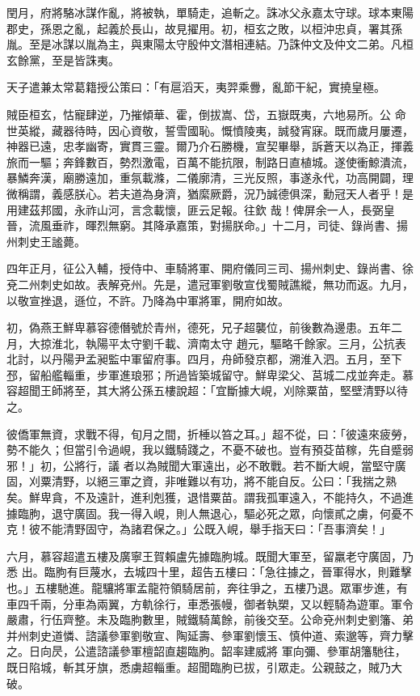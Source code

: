 \begin{pinyinscope}
 閏月，府將駱冰謀作亂，將被執，單騎走，追斬之。誅冰父永嘉太守球。球本東陽郡史，孫恩之亂，起義於長山，故見擢用。初，桓玄之敗，以桓沖忠貞，署其孫胤。至是冰謀以胤為主，與東陽太守殷仲文潛相連結。乃誅仲文及仲文二弟。凡桓玄餘黨，至是皆誅夷。



 天子遣兼太常葛籍授公策曰：「有扈滔天，夷羿乘釁，亂節干紀，實撓皇極。



 賊臣桓玄，怙寵肆逆，乃摧傾華、霍，倒拔嵩、岱，五嶽既夷，六地易所。公
 命世英縱，藏器待時，因心資敬，誓雪國恥。慨憤陵夷，誠發宵寐。既而歲月屢遷，神器已遠，忠孝幽寄，實貫三靈。爾乃介石勝機，宣契畢舉，訴蒼天以為正，揮義旅而一驅；奔鋒數百，勢烈激電，百萬不能抗限，制路日直植城。遂使衝鯨潰流，暴鱗奔漢，廟勝遠加，重氛載滌，二儀廓清，三光反照，事遂永代，功高開闢，理微稱謂，義感朕心。若夫道為身濟，猶縻厥爵，況乃誠德俱深，勳冠天人者乎！是用建茲邦國，永祚山河，言念載懷，匪云足報。往欽
 哉！俾屏余一人，長弼皇晉，流風垂祚，暉烈無窮。其降承嘉策，對揚朕命。」十二月，司徒、錄尚書、揚州刺史王謐薨。



 四年正月，征公入輔，授侍中、車騎將軍、開府儀同三司、揚州刺史、錄尚書、徐兗二州刺史如故。表解兗州。先是，遣冠軍劉敬宣伐蜀賊譙縱，無功而返。九月，以敬宣挫退，遜位，不許。乃降為中軍將軍，開府如故。



 初，偽燕王鮮卑慕容德僭號於青州，德死，兄子超襲位，前後數為邊患。五年二月，大掠淮北，執陽平太守劉千載、濟南太守
 趙元，驅略千餘家。三月，公抗表北討，以丹陽尹孟昶監中軍留府事。四月，舟師發京都，溯淮入泗。五月，至下邳，留船艦輜重，步軍進琅邪；所過皆築城留守。鮮卑梁父、莒城二戍並奔走。慕容超聞王師將至，其大將公孫五樓說超：「宜斷據大峴，刈除粟苗，堅壁清野以待之。



 彼僑軍無資，求戰不得，旬月之間，折棰以笞之耳。」超不從，曰：「彼遠來疲勞，勢不能久；但當引令過峴，我以鐵騎踐之，不憂不破也。豈有預芟苗稼，先自蹙弱邪！」初，公將行，議
 者以為賊聞大軍遠出，必不敢戰。若不斷大峴，當堅守廣固，刈粟清野，以絕三軍之資，非唯難以有功，將不能自反。公曰：「我揣之熟矣。鮮卑貪，不及遠計，進利剋獲，退惜粟苗。謂我孤軍遠入，不能持久，不過進據臨朐，退守廣固。我一得入峴，則人無退心，驅必死之眾，向懷貳之虜，何憂不克！彼不能清野固守，為諸君保之。」公既入峴，舉手指天曰：「吾事濟矣！」



 六月，慕容超遣五樓及廣寧王賀賴盧先據臨朐城。既聞大軍至，留羸老守廣固，乃悉
 出。臨朐有巨蔑水，去城四十里，超告五樓曰：「急往據之，晉軍得水，則難擊也。」五樓馳進。龍驤將軍孟龍符領騎居前，奔往爭之，五樓乃退。眾軍步進，有車四千兩，分車為兩翼，方軌徐行，車悉張幔，御者執槊，又以輕騎為遊軍。軍令嚴肅，行伍齊整。未及臨朐數里，賊鐵騎萬餘，前後交至。公命兗州刺史劉籓、弟并州刺史道憐、諮議參軍劉敬宣、陶延壽、參軍劉懷玉、慎仲道、索邈等，齊力擊之。日向昃，公遣諮議參軍檀韶直趨臨朐。韶率建威將
 軍向彌、參軍胡籓馳往，既日陷城，斬其牙旗，悉虜超輜重。超聞臨朐已拔，引眾走。公親鼓之，賊乃大破。




\end{pinyinscope}
